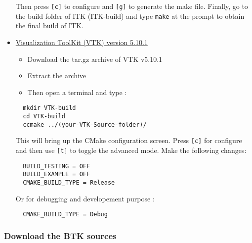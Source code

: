 \documentclass[a4paper,10pt]{article}
\begin{document}
\begin{itemize}
\begin{verbatim}
  \end{verbatim}
  Then press \texttt{[c]} to configure and \texttt{[g]} to generate the make file.
  Finally, go to the build folder of ITK (ITK-build) and type \texttt{make} at the prompt to obtain the final build of ITK.
   \item \href{http://www.vtk.org/VTK/resources/software.html#previous}{Visualization ToolKit (VTK) version 5.10.1 }
 \begin{itemize}
 \item Download the tar.gz archive of VTK v5.10.1
 \item Extract the archive 
 \item Then open a terminal and type :
 \end{itemize}
  \begin{verbatim}
  mkdir VTK-build
  cd VTK-build
  ccmake ../(your-VTK-Source-folder)/
  \end{verbatim}
  This will bring up the CMake configuration screen. Press \texttt{[c]} for
  configure and then use \texttt{[t]} to toggle the advanced mode. Make the
  following changes:
  \begin{verbatim}
  BUILD_TESTING = OFF
  BUILD_EXAMPLE = OFF
  CMAKE_BUILD_TYPE = Release
  \end{verbatim}
  Or for debugging and developement purpose :
  \begin{verbatim}
  CMAKE_BUILD_TYPE = Debug

\end{verbatim}

  \end{itemize}

  \subsubsection{Download the BTK sources}
\end{document}
